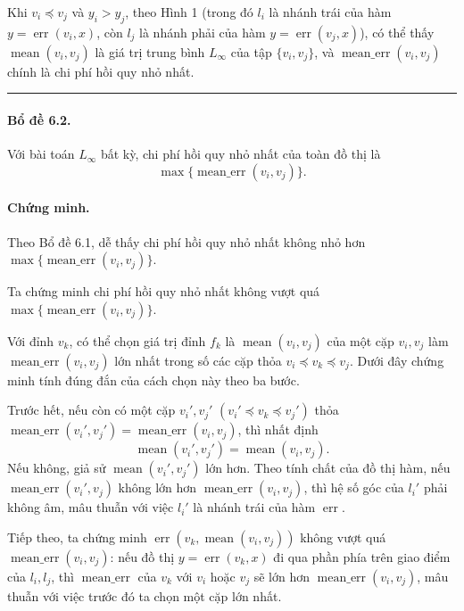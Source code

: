 \documentclass[11pt]{article}
\newcommand{\qedmark}{\hfill\rule{0.7ex}{0.7ex}}
\begin{document}
Khi \(v_i\preceq v_j\) và \(y_i>y_j\), theo Hình 1 (trong đó \(l_i\) là nhánh
trái của hàm \(y=\operatorname{err}(v_i,x)\), còn \(l_j\) là nhánh phải của hàm
\(y=\operatorname{err}(v_j,x)\)), có thể thấy \(\operatorname{mean}(v_i,v_j)\)
là giá trị trung bình \(L_\infty\) của tập \(\{v_i,v_j\}\), và
\(\operatorname{mean\_err}(v_i,v_j)\) chính là chi phí hồi quy nhỏ nhất.
\qedmark

\paragraph{Bổ đề 6.2.}
Với bài toán \(L_\infty\) bất kỳ, chi phí hồi quy nhỏ nhất của toàn đồ thị là
\[
  \max\{\operatorname{mean\_err}(v_i,v_j)\}.
\]

\paragraph{Chứng minh.}
Theo Bổ đề 6.1, dễ thấy chi phí hồi quy nhỏ nhất không nhỏ hơn
\(\max\{\operatorname{mean\_err}(v_i,v_j)\}\).

Ta chứng minh chi phí hồi quy nhỏ nhất không vượt quá
\(\max\{\operatorname{mean\_err}(v_i,v_j)\}\).

Với đỉnh \(v_k\), có thể chọn giá trị đỉnh \(f_k\) là
\(\operatorname{mean}(v_i,v_j)\) của một cặp \(v_i,v_j\) làm
\(\operatorname{mean\_err}(v_i,v_j)\) lớn nhất trong số các cặp thỏa
\(v_i\preceq v_k\preceq v_j\). Dưới đây chứng minh tính đúng đắn của cách chọn
này theo ba bước.

Trước hết, nếu còn có một cặp \(v_i',v_j'\)
\((v_i'\preceq v_k\preceq v_j')\) thỏa
\(\operatorname{mean\_err}(v_i',v_j')=\operatorname{mean\_err}(v_i,v_j)\), thì
nhất định
\[
  \operatorname{mean}(v_i',v_j')=\operatorname{mean}(v_i,v_j).
\]
Nếu không, giả sử \(\operatorname{mean}(v_i',v_j')\) lớn hơn. Theo tính chất của
đồ thị hàm, nếu \(\operatorname{mean\_err}(v_i',v_j)\) không lớn hơn
\(\operatorname{mean\_err}(v_i,v_j)\), thì hệ số góc của \(l_i'\) phải không âm,
mâu thuẫn với việc \(l_i'\) là nhánh trái của hàm \(\operatorname{err}\).

Tiếp theo, ta chứng minh
\(\operatorname{err}(v_k,\operatorname{mean}(v_i,v_j))\) không vượt quá
\(\operatorname{mean\_err}(v_i,v_j)\): nếu đồ thị
\(y=\operatorname{err}(v_k,x)\) đi qua phần phía trên giao điểm của \(l_i,l_j\),
thì \(\operatorname{mean\_err}\) của \(v_k\) với \(v_i\) hoặc \(v_j\) sẽ lớn hơn
\(\operatorname{mean\_err}(v_i,v_j)\), mâu thuẫn với việc trước đó ta chọn một
cặp lớn nhất.
\end{document}
